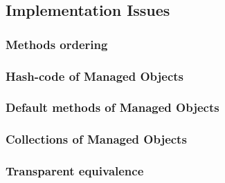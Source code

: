 \subsection{Implementation Issues}\label{Implementation Issues}

\subsubsection{Methods ordering}\label{Methods ordering}

\subsubsection{Hash-code of Managed Objects}\label{Hashcode of Managed Objects}

\subsubsection{Default methods of Managed Objects}\label{Default methods of Managed Objects}

\subsubsection{Collections of Managed Objects}\label{Collections of Managed Objects}

\subsubsection{Transparent equivalence}\label{Transparent equivalence}
